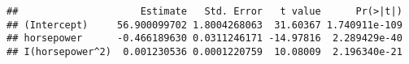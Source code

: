 \documentclass[
]{article}
\newenvironment{Shaded}{\begin{snugshade}}{\end{snugshade}}
\newcommand{\DataTypeTok}[1]{\textcolor[rgb]{0.13,0.29,0.53}{#1}}
\newcommand{\DecValTok}[1]{\textcolor[rgb]{0.00,0.00,0.81}{#1}}
\newcommand{\KeywordTok}[1]{\textcolor[rgb]{0.13,0.29,0.53}{\textbf{#1}}}
\newcommand{\NormalTok}[1]{#1}
\newcommand{\OperatorTok}[1]{\textcolor[rgb]{0.81,0.36,0.00}{\textbf{#1}}}
\newcommand{\StringTok}[1]{\textcolor[rgb]{0.31,0.60,0.02}{#1}}
\begin{document}
\begin{Shaded}
\end{Shaded}

\begin{verbatim}
##                     Estimate   Std. Error   t value      Pr(>|t|)
## (Intercept)     56.900099702 1.8004268063  31.60367 1.740911e-109
## horsepower      -0.466189630 0.0311246171 -14.97816  2.289429e-40
## I(horsepower^2)  0.001230536 0.0001220759  10.08009  2.196340e-21
\end{verbatim}
\end{document}
